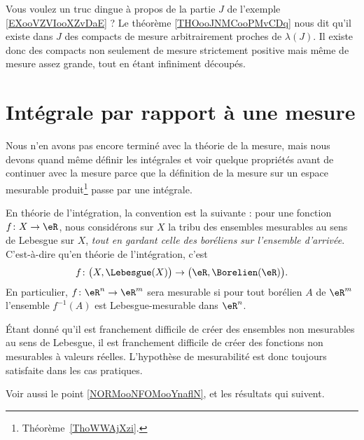 Vous voulez un truc dingue à propos de la partie \( J\) de l'exemple \ref{EXooVZVIooXZvDaE} ? Le théorème \ref{THOooJNMCooPMvCDq} nous dit qu'il existe dans \( J\) des compacts de mesure arbitrairement proches de \( \lambda(J)\). Il existe donc des compacts non seulement de mesure strictement positive mais même de mesure assez grande, tout en étant infiniment découpés.

\section{Intégrale par rapport à une mesure}

\begin{normaltext}
    Nous n'en avons pas encore terminé avec la théorie de la mesure, mais nous devons quand même définir les intégrales et voir quelque propriétés avant de continuer avec la mesure parce que la définition de la mesure sur un espace mesurable produit\footnote{Théorème~\ref{ThoWWAjXzi}.} passe par une intégrale.
\end{normaltext}

\begin{normaltext}      \label{NORMooFZEDooIxSgLe}
    En théorie de l'intégration, la convention est la suivante : pour une fonction \( f\colon X\to \eR\), nous considérons sur \( X\) la tribu des ensembles mesurables au sens de Lebesgue sur \( X\), \emph{tout en gardant celle des boréliens sur l'ensemble d'arrivée}. C'est-à-dire qu'en théorie de l'intégration, c'est
    \begin{equation}
        f\colon \big( X,\Lebesgue(X) \big)\to \big( \eR,\Borelien(\eR) \big).
    \end{equation}
    En particulier, \( f\colon \eR^n\to \eR^m\) sera mesurable si pour tout borélien \( A\) de \( \eR^m\) l'ensemble \( f^{-1}(A)\) est Lebesgue-mesurable dans \( \eR^n\).

    Étant donné qu'il est franchement difficile de créer des ensembles non mesurables au sens de Lebesgue, il est franchement difficile de créer des fonctions non mesurables à valeurs réelles. L'hypothèse de mesurabilité est donc toujours satisfaite dans les cas pratiques.

    Voir aussi le point \ref{NORMooNFOMooYnaflN}, et les résultats qui suivent.
\end{normaltext}


